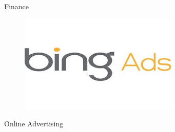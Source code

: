 \begin{frame}
\begin{columns}
\begin{center}
\begin{figure}
      \end{figure}
      \vspace{0.5cm}
      Finance
      \begin{figure}
        \includegraphics[scale=0.31]{figs/ads.jpg}\\
      \end{figure}
      Online Advertising
    \end{center}
  \end{columns}
\end{frame}

